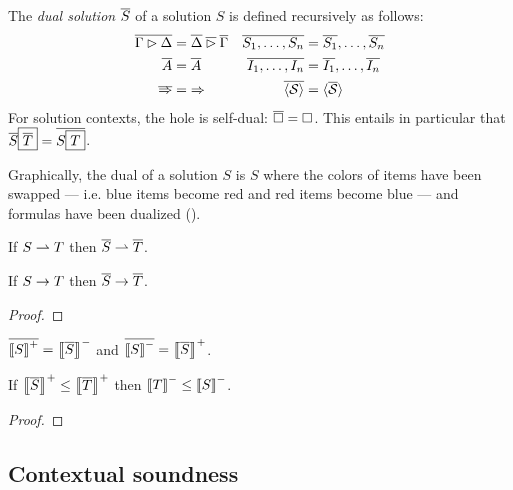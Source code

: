 \begin{definition}
  The \emph{dual solution} $\overline{S}$ of a solution $S$ is defined
  recursively as follows:
  \begin{align*}
    \overline{\Gamma \mathbin{\rhd} \Delta} &= \overline{\Delta} \mathbin{\overline{\mathbin{\rhd}}} \overline{\Gamma} &
    \overline{S_1, \ldots, S_n} &= \overline{S_1}, \ldots, \overline{S_n} \\
    \overline{A} &= \overline{A} &
    \overline{I_1, \ldots, I_n} &= \overline{I_1}, \ldots, \overline{I_n} \\
    \overline{\Rightarrow} &= {\Rightarrow} &
    \overline{\mathbin{\langle \mathcal{S} \rangle}} &= \mathbin{\langle \overline{\mathcal{S}} \rangle}
  \end{align*}
  For solution contexts, the hole is self-dual: $\overline{\square} = \square$. This
  entails in particular that $\overline{S}\fbox{$\overline{T}$} =
  \overline{S\fbox{$T$}}$.
\end{definition}

Graphically, the dual of a solution $S$ is $S$ where the colors of items have
been swapped --- i.e. blue items become red and red items become blue --- and
formulas have been dualized ().

\begin{lemma}
  If $S \rightharpoonup T$ then $\overline{S} \rightharpoonup \overline{T}$.
\end{lemma}

\begin{lemma}
  If $S \rightarrow T$ then $\overline{S} \rightarrow \overline{T}$.
\end{lemma}
\begin{proof}
\end{proof}

\begin{lemma}
  $\overline{\left\llbracket S \right\rrbracket^+} = \left\llbracket \overline{S} \right\rrbracket^-$ and $\overline{\left\llbracket S \right\rrbracket^-} =
  \left\llbracket \overline{S} \right\rrbracket^+$.
\end{lemma}

\begin{lemma}
  If $\left\llbracket \overline{S} \right\rrbracket^+ \leq \left\llbracket \overline{T} \right\rrbracket^+$ then $\left\llbracket T \right\rrbracket^- \leq
  \left\llbracket S \right\rrbracket^-$.
\end{lemma}
\begin{proof}
\end{proof}

\subsection{Contextual soundness}

